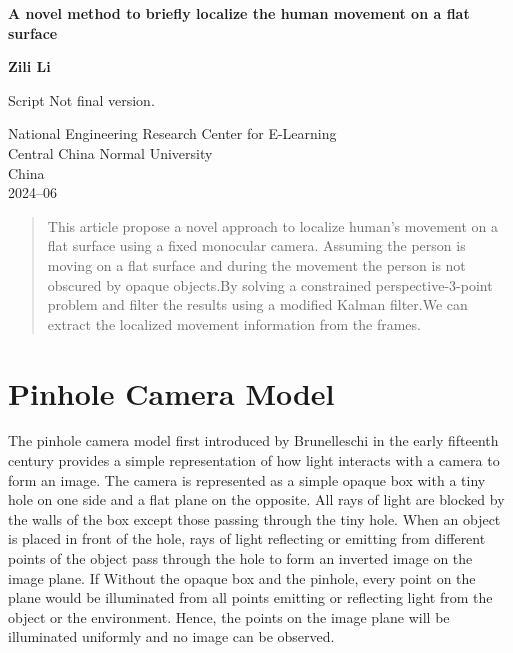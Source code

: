 \documentclass{article}
\begin{document}
\begin{titlepage}
    \begin{center}
        \vspace*{1cm}
        \Huge
        \textbf{A novel method to briefly localize the human movement on a flat surface}

        \vspace{1.5cm}


        \vspace{1.5cm}
        \LARGE
        \textbf{Zili Li}

        \vfill

        Script Not final version.

        \vspace{0.8cm}
        \normalsize

        National Engineering Research Center for E-Learning\\
        Central China Normal University\\
        China \\
        2024--06

    \end{center}
\end{titlepage}
\begin{abstract}
    This article propose a novel approach to localize human's movement on a flat surface using a fixed monocular camera. Assuming the person is moving on a flat surface and during the movement the person is not obscured by opaque objects.By solving a constrained perspective-3-point problem and filter the results using a modified Kalman filter.We can extract the localized movement information from the frames.
\end{abstract}
\section{Pinhole Camera Model} 
The pinhole camera model first introduced by Brunelleschi in the early fifteenth century provides a simple representation of how light interacts with a camera to form an image. The camera is represented as a simple opaque box with a tiny hole on one side and a flat plane on the opposite. All rays of light are blocked by the walls of the box except those passing through the tiny hole.
When an object is placed in front of the hole, rays of light reflecting or emitting from different points of the object pass through the hole to form an inverted image on the image plane. If Without the opaque box and the pinhole, every point on the plane would be illuminated from all points emitting or reflecting light from the object or the environment. Hence, the points on the image plane will be illuminated uniformly and no image can be observed.
\end{document}
